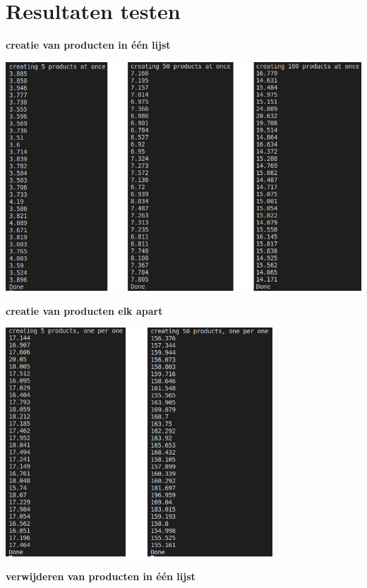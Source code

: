 \section{Resultaten testen}
\textbf{creatie van producten in één lijst}
\begin{center}
	\includegraphics[width=14cm]{img/test-result-1}\\[1cm]
\end{center}
\textbf{creatie van producten elk apart}
\begin{center}
	\includegraphics[width=10cm]{img/test-result-2}\\[1cm]
\end{center}
\textbf{verwijderen van producten in één lijst}
